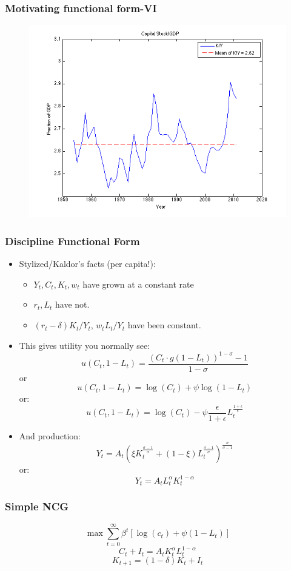 \documentclass{beamer}
\begin{document}
\begin{frame}
\frametitle[alignment=center]{Motivating functional form-VI}
\begin{figure}
\centering
\includegraphics[scale=0.5]{Figures/KoverY}
\end{figure}
\end{frame}

\begin{frame}
\frametitle[alignment=center]{Discipline Functional Form}
\begin{itemize}
\item Stylized/Kaldor's facts (per capita!):
\begin{itemize}
\item $Y_t,C_t,K_t,w_t$ have grown at a constant rate
\item $r_t,L_t$ have not.
\item $(r_t-\delta)K_t/Y_t$, $w_tL_t/Y_t$ have been constant.
\end{itemize}
\item This gives utility you normally see:
$$u(C_t,1-L_t)=\frac{(C_t\cdot g(1-L_t))^{1-\sigma}-1}{1-\sigma}$$
or
$$u(C_t,1-L_t) = \log(C_t)+\psi \log(1-L_t)$$
or:
$$u(C_t,1-L_t) = \log(C_t)-\psi \frac{\epsilon}{1+\epsilon}L_t^{\frac{1+\epsilon}{\epsilon}}$$
\item And production:
$$Y_t=A_t\left(\xi K_t^\frac{\sigma-1}{\sigma}+(1-\xi) L_t^\frac{\sigma-1}{\sigma}\right)^\frac{\sigma}{\sigma-1}$$
or:
$$Y_t=A_tL_t^\alpha K_t^{1-\alpha}$$
\end{itemize}
\end{frame}

\begin{frame}
\frametitle[alignment=center]{Simple NCG}
$$\max\sum_{t=0}^\infty \beta^t\left[\log(c_t)+\psi\left(1-L_t\right)\right]$$
\bigskip
$$C_t+I_t=A_tK_t^\alpha L_t^{1-\alpha}$$
\bigskip
$$K_{t+1}=(1-\delta)K_t+I_t$$
\end{frame}
\end{document}
